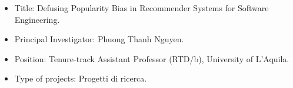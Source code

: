 \begin{itemize}
	\item Title: Defusing Popularity Bias in Recommender Systems for Software Engineering.
	\item Principal Investigator: Phuong Thanh Nguyen.
	\item Position: Tenure-track Assistant Professor (RTD/b), University of L'Aquila.
	\item Type of projects: Progetti di ricerca.
\end{itemize}
